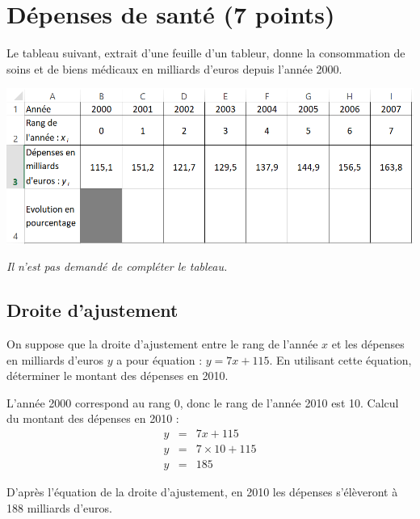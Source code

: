 
\section{Dépenses de santé (7 points)}

Le tableau suivant, extrait d'une feuille d'un tableur, donne la consommation de soins et de biens médicaux en milliards d'euros depuis l'année 2000.

\begin{center}
	\includegraphics[scale=0.65]{img/biens_medicaux2}
\end{center}

\emph{Il n'est pas demandé de compléter le tableau.}

\subsection{Droite d'ajustement}

\begin{questions}
	\question[1] On suppose que la droite d'ajustement entre le rang de l'année $x$ et les dépenses en milliards d'euros $y$ a pour équation : $y = 7x + 115$. En utilisant cette équation, déterminer le montant des dépenses en 2010. 
	\begin{solution}
		L'année 2000 correspond au rang 0, donc le rang de l'année 2010 est 10. Calcul du montant des dépenses en 2010 :
		\begin{eqnarray*}
			y &=& 7x + 115 \\
			y &=& 7 \times 10 + 115 \\
			y &=& 185
		\end{eqnarray*}
	
	D'après l'équation de la droite d'ajustement, en 2010 les dépenses s'élèveront à 188 milliards d'euros.
	\end{solution}

\end{questions}

